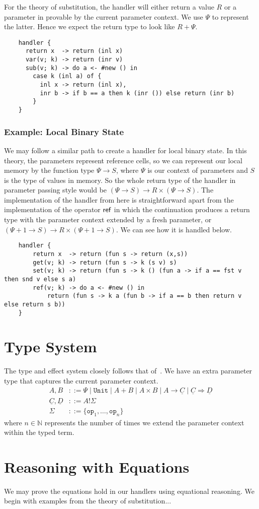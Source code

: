 \documentclass{scrartcl}
\theoremstyle{definition}
\newcommand{\op}{\mathtt{op}}
\newcommand{\Unit}{\mathtt{Unit}}
\newcommand{\PCtx}{\Psi}
\newcommand{\cC}{\underline{C}}
\newcommand{\cD}{\underline{D}}
\begin{document}
For the theory of substitution, the handler will either return a value $R$ or a parameter in provable by the current parameter context.
We use $\PCtx$ to represent the latter. Hence we expect the return type to look like $R+\PCtx$.
\begin{lstlisting}
    handler {
      return x  -> return (inl x)
      var(v; k) -> return (inr v)
      sub(v; k) -> do a <- #new () in
        case k (inl a) of {
          inl x -> return (inl x),
          inr b -> if b == a then k (inr ()) else return (inr b)
        }
    }
\end{lstlisting}

\subsubsection{Example: Local Binary State}

We may follow a similar path to create a handler for local binary state.
In this theory, the parameters represent reference cells, so we can represent our local memory by the function type $\PCtx \to S$, where $\PCtx$
is our context of parameters and $S$ is the type of values in memory. So the whole return type of the handler in parameter passing style would be
$(\PCtx \to S) \to R \times (\PCtx \to S)$. The implementation of the handler from here is straightforward apart from the implementation of the operator
$\mathsf{ref}$ in which the continuation produces a return type with the parameter context extended by a fresh parameter, or $(\PCtx +1 \to S) \to R \times (\PCtx + 1 \to S)$.
We can see how it is handled below.
\begin{lstlisting}
    handler {
        return x  -> return (fun s -> return (x,s))
        get(v; k) -> return (fun s -> k (s v) s)
        set(v; k) -> return (fun s -> k () (fun a -> if a == fst v then snd v else s a)
        ref(v; k) -> do a <- #new () in
            return (fun s -> k a (fun b -> if a == b then return v else return s b))
    }
\end{lstlisting}

\section{Type System}

The type and effect system closely follows that of~\cite{pretnar_introduction_2015}. We have an extra parameter type that captures the current parameter context. 
\begin{align*}
    A, B &::= \PCtx \mid \Unit \mid A + B \mid A \times B \mid A \to \cC \mid \cC \Rightarrow \cD \\
    \cC, \cD &::= A!\Sigma \\
    \Sigma &::= \{\op_1,\dots,\op_n\}
\end{align*}
where $n\in\mathbb{N}$ represents the number of times we extend the parameter context within the typed term.

\section{Reasoning with Equations}

We may prove the equations hold in our handlers using equational reasoning. We begin with examples from the theory of substitution...

\printbibliography
\end{document}
